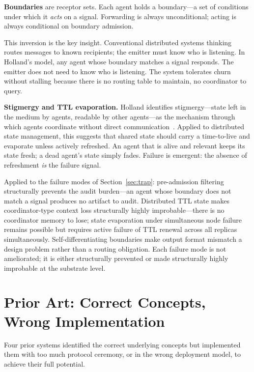 \documentclass[11pt]{article}
\begin{document}
\textbf{Boundaries} are receptor sets. Each agent holds a boundary---a set of
conditions under which it \emph{acts} on a signal. Forwarding is always
unconditional; acting is always conditional on boundary admission.

This inversion is the key insight. Conventional distributed systems thinking
routes messages to known recipients; the emitter must know who is listening. In
Holland's model, any agent whose boundary matches a signal responds. The emitter
does not need to know who is listening. The system tolerates churn without stalling
because there is no routing table to maintain, no coordinator to query.

\textbf{Stigmergy and TTL evaporation.} Holland identifies stigmergy---state left
in the medium by agents, readable by other agents---as the mechanism through which
agents coordinate without direct communication~\cite{dorigo}. Applied to
distributed state management, this suggests that shared state should carry a
time-to-live and evaporate unless actively refreshed. An agent that is alive and
relevant keeps its state fresh; a dead agent's state simply fades. Failure is
emergent: the absence of refreshment \emph{is} the failure signal.

Applied to the failure modes of Section~\ref{sec:trap}: pre-admission filtering
structurally prevents the audit burden---an agent whose boundary does not match a
signal produces no artifact to audit. Distributed TTL state makes
coordinator-type context loss structurally highly improbable---there is no
coordinator memory to lose; state evaporation under simultaneous node failure
remains possible but requires active failure of TTL renewal across all replicas
simultaneously. Self-differentiating boundaries make output format mismatch a
design problem rather than a routing obligation. Each failure mode is not
ameliorated; it is either structurally prevented or made structurally highly
improbable at the substrate level.

\section{Prior Art: Correct Concepts, Wrong Implementation}

Four prior systems identified the correct underlying concepts but implemented them
with too much protocol ceremony, or in the wrong deployment model, to achieve
their full potential.
\end{document}
